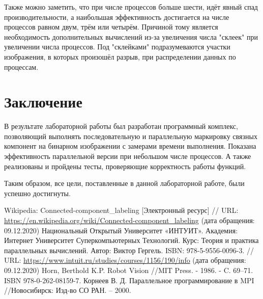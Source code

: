 \documentclass{report}
\begin{document}
	\par Также можно заметить, что при числе процессов больше шести, идёт явный спад производительности, а наибольшая эффективность достигается на числе процессов равном двум, трём или четырём. Причиной тому является необходимость дополнительных вычислений из-за увеличения числа "склеек" при увеличении числа процессов. Под "склейками" подразумеваются участки изображения, в которых произошёл разрыв, при распределении данных по процессам.
	\newpage


	\section*{Заключение}
		\par В результате лабораторной работы был разработан программный комплекс, позволяющий выполнять последовательную и параллельную маркировку связных компонент на бинарном изображении с замерами времени выполнения. Показана эффективность параллельной версии при небольшом числе процессов. А также реализованы и пройдены тесты, проверяющие корректность работы функций.
		\par Таким образом, все цели, поставленные в данной лабораторной работе, были успешно достигнуты.
	\newpage


	\begin{thebibliography}{1}
		 Wikipedia: Connected-component\_labeling [Электронный ресурс] // URL: \url {https://en.wikipedia.org/wiki/Connected-component_labeling} (дата обращения: 09.12.2020)
		 Национальный Открытый Университет «ИНТУИТ». Академия: Интернет Университет Суперкомпьютерных Технологий. Курс: Теория и практика параллельных вычислений. Автор: Виктор Гергель. ISBN: 978-5-9556-0096-3. // URL: \url {https://www.intuit.ru/studies/courses/1156/190/info} (дата обращения: 09.12.2020)
		 Horn, Berthold K.P. Robot Vision //MIT Press. - 1986. - C. 69–71. ISBN 978-0-262-08159-7.
		 Корнеев В. Д. Параллельное программирование в MPI //Новосибирск: Изд-во СО РАН. – 2000.
	\end{thebibliography}
	\newpage


\end{document}
